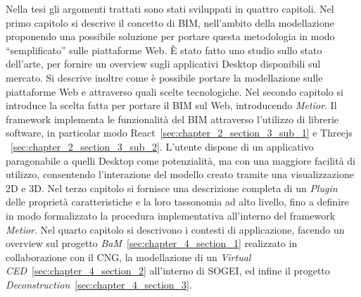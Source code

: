 Nella tesi gli argomenti trattati sono stati sviluppati in quattro capitoli.
Nel primo capitolo si descrive il concetto di BIM, nell’ambito della modellazione proponendo una possibile soluzione
per portare questa metodologia in modo ``semplificato'' sulle piattaforme Web.
\`E stato fatto uno studio sullo stato dell’arte, per fornire un overview
sugli applicativi Desktop disponibili sul mercato. Si descrive inoltre come è
possibile portare la modellazione sulle piattaforme Web e attraverso quali scelte tecnologiche.
Nel secondo capitolo si introduce la scelta fatta per portare il BIM sul Web, introducendo \emph{Metior}.
Il framework implementa le funzionalità del BIM attraverso l'utilizzo di librerie software,
in particolar modo React~\ref{sec:chapter_2_section_3_sub_1} e Threejs ~\ref{sec:chapter_2_section_3_sub_2}.
L'utente dispone di un applicativo paragonabile a quelli
Desktop come potenzialità, ma con una maggiore facilità di utilizzo, consentendo l'interazione del modello creato
tramite una visualizzazione 2D e 3D.
Nel terzo capitolo si fornisce una descrizione completa di un \emph{Plugin} delle
proprietà caratteristiche e la loro tassonomia ad alto livello, fino a definire in modo formalizzato
la procedura implementativa all'interno del framework \emph{Metior}.
Nel quarto capitolo si descrivono i contesti di applicazione, facendo un overview sul
progetto \emph{BaM}~\ref{sec:chapter_4_section_1} realizzato in collaborazione con il CNG,
la modellazione di un \emph{Virtual CED}~\ref{sec:chapter_4_section_2} all'interno di SOGEI, ed
infine il progetto \emph{Deconstruction}~\ref{sec:chapter_4_section_3}.
